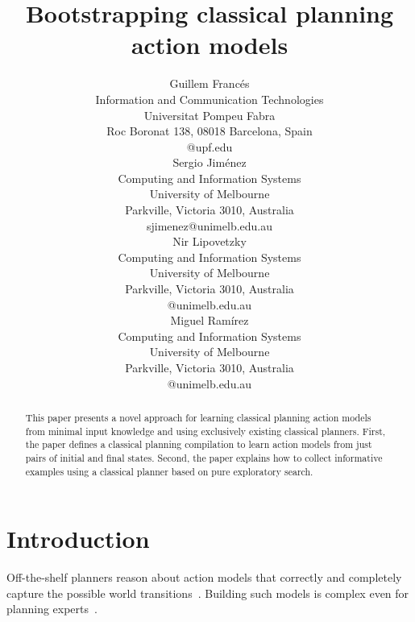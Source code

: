 \documentclass[letterpaper]{article} %
\begin{document}
\title{Bootstrapping classical planning action models}

\author{Guillem Franc\'es\\
{\small Information and Communication Technologies}\\
{\small Universitat Pompeu Fabra}\\
{\small Roc Boronat 138, 08018 Barcelona, Spain}\\
{\small @upf.edu}\\
\And Sergio Jim\'enez\\
{\small Computing and Information Systems}\\
{\small University of Melbourne}\\
{\small Parkville, Victoria 3010, Australia}\\
{\small sjimenez@unimelb.edu.au}\\
\And Nir Lipovetzky\\
{\small Computing and Information Systems}\\
{\small University of Melbourne}\\
{\small Parkville, Victoria 3010, Australia}\\
{\small @unimelb.edu.au}\\
\And Miguel Ram\'irez\\
{\small Computing and Information Systems}\\
{\small University of Melbourne}\\
{\small Parkville, Victoria 3010, Australia}\\
{\small @unimelb.edu.au}\\
}

\maketitle
\begin{abstract}
This paper presents a novel approach for learning classical planning action models from minimal input knowledge and using exclusively existing classical planners. First, the paper defines a classical planning compilation to learn action models from just pairs of initial and final states. Second, the paper explains how to collect informative examples using a classical planner based on pure exploratory search. 
\end{abstract}


\section{Introduction}
Off-the-shelf planners reason about action models that correctly and completely capture the possible world transitions~\cite{geffner:book:2013}. Building such models is complex even for planning experts~\cite{kambhampati:modellite:AAAI2007}. 
\end{document}
